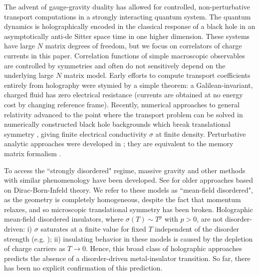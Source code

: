 \documentclass[10pt, oneside]{book}
\newcommand\new[1]{{\color{blue} #1}}
\begin{document}
\begin{doublespace}
The advent of gauge-gravity duality \cite{Hartnoll:2009sz, McGreevy:2009xe, Sachdev:2011wg}  has allowed for controlled, non-perturbative transport computations in a strongly interacting quantum system.  The quantum dynamics is holographically encoded in the classical response of a black hole in an asymptotically anti-de Sitter space time in one higher dimension.  These systems have large $N$ matrix degrees of freedom, but we focus on correlators of charge currents in this paper.   Correlation functions of simple macroscopic observables are controlled by symmetries and often do not sensitively depend on the underlying large $N$ matrix model.  
  Early efforts to compute transport coefficients entirely from holography were stymied by a simple theorem:
  a Galilean-invariant, charged fluid has zero electrical resistance  (currents are obtained at no energy cost by changing reference frame).  Recently, numerical approaches to general relativity advanced to the point where the transport problem can be solved in numerically constructed black hole backgrounds which break translational symmetry \cite{Horowitz:2012ky, Horowitz:2012gs, Horowitz:2013jaa, Chesler:2013qla,Ling:2013nxa, Hartnoll:2014cua, Donos:2014yya, Hartnoll:2015faa, Rangamani:2015hka}, giving finite electrical conductivity $\sigma$ at finite density.   Perturbative analytic approaches were developed in \cite{Hartnoll:2012rj, Blake:2013owa, lucas1401}; they are equivalent to the memory matrix formalism \cite{Lucas:2015vna}.    

To access the ``strongly disordered" regime, massive gravity \cite{Vegh:2013sk, Davison:2013jba, Blake:2013bqa, Davison:2013txa} and other methods \cite{Donos:2012js, Donos:2013eha, Andrade:2013gsa, Gouteraux:2014hca, Donos:2014oha, Kim:2014bza, Davison:2014lua, Davison:2015bea, Blake:2015epa} with similar phenomenology have been developed.  See \cite{Karch:2007pd} for older approaches based on Dirac-Born-Infeld theory.  We refer to these models as ``mean-field disordered", as the geometry is completely homogeneous, despite the fact that momentum relaxes, and so microscopic translational symmetry has been broken.
Holographic mean-field disordered insulators, where $\sigma(T) \sim T^p$ with $p>0$, are not disorder-driven: i) $\sigma$ saturates at a finite value for fixed $T$ independent of the disorder strength (e.g. \cite{Donos:2014oha}); ii) insulating behavior in these models is caused by the depletion of charge carriers as $T\rightarrow 0$.   Hence, this broad class of holographic approaches predicts the absence of a disorder-driven metal-insulator transition.  So far, there has been no explicit confirmation of this prediction.


\end{doublespace}
\end{document}
